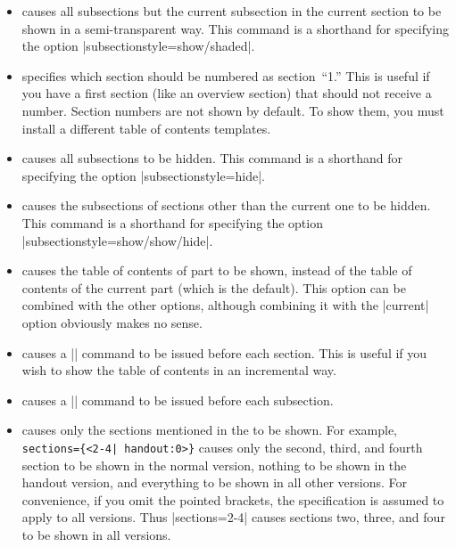 \begin{command}{\tableofcontents{}}
\begin{itemize}
\begin{verbatim}
sectionstyle=show/shaded,subsectionstyle=show/show/shaded
\end{verbatim}
  \item
     causes all subsections but the current subsection in the current section to be shown in a semi-transparent way. This command is a shorthand for specifying the option |subsectionstyle=show/shaded|.
  \item
     specifies which section should be numbered as section~``1.''  This is useful if you have a first section (like an overview section) that should not receive a number. Section numbers are not shown by default. To show them, you must install a different table of contents templates.
  \item
     causes all subsections to be hidden. This command is a shorthand for specifying the option |subsectionstyle=hide|.
  \item
     causes the subsections of sections other than the current one to be hidden. This command is a shorthand for specifying the option |subsectionstyle=show/show/hide|.
  \item
     causes the table of contents of part  to be shown, instead of the table of contents of the current part (which is the default). This option can be combined with the other options, although combining it with the |current| option obviously makes no sense.
  \item
     causes a |\pause| command to be issued before each section. This is useful if you wish to show the table of contents in an incremental way.
  \item
     causes a |\pause| command to be issued before each subsection.
  \item
     causes only the sections mentioned in the  to be shown. For example, \verb/sections={<2-4| handout:0>}/ causes only the second, third, and fourth section to be shown in the normal version, nothing to be shown in the handout version, and everything to be shown in all other versions. For convenience, if you omit the pointed brackets, the specification is assumed to apply to all versions. Thus |sections={2-4}| causes sections two, three, and four to be shown in all versions.

\end{itemize}
\end{command}
